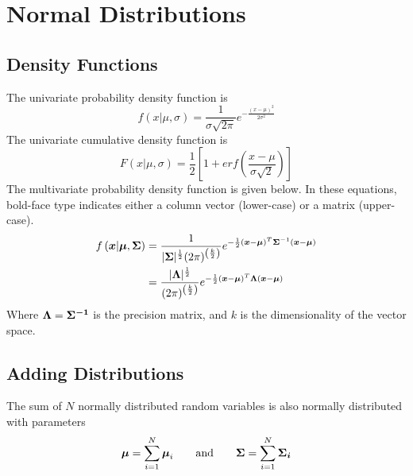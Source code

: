 \documentclass[../../main.tex]{subfiles}
\begin{document}
\chapter{Normal Distributions}

\section{Density Functions}
The univariate probability density function is
\begin{equation}
    \label{eq:uninormaldens}
    f\left(x| \mu, \sigma \right) =
    \frac{1}{\sigma\sqrt{2\pi}}e^{-\frac{(x - \mu)^2}{2\sigma^2}}
\end{equation}
The univariate cumulative density function is
\begin{equation}
    \label{eq:uninormalcum}
    F\left(x| \mu, \sigma \right) =
    \frac{1}{2}\left[ 1 + erf\left(\frac{x - \mu}{\sigma \sqrt{2}}  \right) \right]
\end{equation}
The multivariate probability density function is given below.  In these
equations, bold-face type indicates either a column vector (lower-case) or a
matrix (upper-case).
\begin{align}
    \label{eq:multinormaldens}
    f\left(\boldsymbol{x}| \boldsymbol{\mu}, \boldsymbol{\Sigma} \right)
    &= \frac{1}{
            |\boldsymbol{\Sigma}|^\frac{1}{2} (2\pi)^{\left(\frac{k}{2}\right)}
        }
        e^{
            -\frac{1}{2}
            (\boldsymbol{x} - \boldsymbol{\mu})^T
            \boldsymbol{\Sigma}^{-1}
            (\boldsymbol{x} - \boldsymbol{\mu})
    }\\
    &= \frac{|\boldsymbol{\Lambda}|^\frac{1}{2}}{
             (2\pi)^{\left(\frac{k}{2}\right)}
        }
        e^{
            -\frac{1}{2}
            (\boldsymbol{x} - \boldsymbol{\mu})^T
            \boldsymbol{\Lambda}
            (\boldsymbol{x} - \boldsymbol{\mu})
    }\nonumber
\end{align}
Where $\boldsymbol{\Lambda} = \boldsymbol{\Sigma^{-1}}$ is the precision
matrix, and $k$ is the dimensionality of the vector space.


\section{Adding Distributions}
The sum of $N$ normally distributed random variables is also normally
distributed with parameters
\begin{equation}
    \label{eq:sumnormalmuvar}
    \boldsymbol{\mu} = \sum\limits_{i=1}^{N}\boldsymbol{\mu}_i
    \qquad\text{and}\qquad
    \boldsymbol{\Sigma} = \sum\limits_{i=1}^{N}\boldsymbol{\Sigma_i}
\end{equation}
\end{document}
